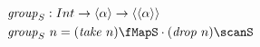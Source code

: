 \documentclass[preview]{standalone}
\begin{document}
\begin{align*}
  \mathit{group}_S &: Int \rightarrow \vect{\alpha} \rightarrow \vect{\vect{\alpha}} \\
  \mathit{group}_S &\ n = (\mathit{take}\ n) \fMapS \cdot (\mathit{drop}\ n) \scanS
\end{align*}
\end{document}
